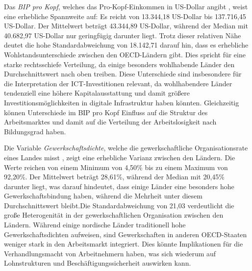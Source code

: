 Das \textit{\ac{BIP} pro Kopf}, welches das Pro-Kopf-Einkommen in US-Dollar angibt 
\parencite{oecd2022gdp}, weist eine erhebliche Spannweite auf: Es reicht von 13.344,18 
US-Dollar bis 137.716,45 US-Dollar. Der Mittelwert beträgt 43.344,89 US-Dollar, während 
der Median mit 40.682,97 US-Dollar nur geringfügig darunter liegt. Trotz dieser relativen 
Nähe deutet die hohe Standardabweichung von 18.142,71 darauf hin, dass es erhebliche 
Wohlstandsunterschiede zwischen den \ac{OECD}-Ländern gibt. Dies spricht für eine starke 
rechtsschiefe Verteilung, da einige besonders wohlhabende Länder den Durchschnittswert 
nach oben treiben. Diese Unterschiede sind insbesondere für die Interpretation der 
\ac{ICT}-Investitionen relevant, da wohlhabendere Länder tendenziell eine höhere 
Kapitalausstattung und damit größere Investitionsmöglichkeiten in digitale Infrastruktur 
haben könnten. Gleichzeitig können Unterschiede im \ac{BIP} pro Kopf Einfluss auf die 
Struktur des Arbeitsmarktes und damit auf die Verteilung der Arbeitslosigkeit nach 
Bildungsgrad haben.

Die Variable \textit{Gewerkschaftsdichte}, welche die gewerkschaftliche Organisationsrate 
eines Landes misst \parencite{oecd2022tud}, zeigt eine erhebliche Varianz zwischen den 
Ländern. Die Werte reichen von einem Minimum von 4,50\% bis zu einem Maximum von 92,20\%. 
Der Mittelwert beträgt 28,61\%, während der Median mit 20,45\% darunter liegt, was darauf 
hindeutet, dass einige Länder eine besonders hohe Gewerkschaftsbindung haben, während die 
Mehrheit unter diesem Durchschnittswert bleibt.Die Standardabweichung von 21,03 
verdeutlicht die große Heterogenität in der gewerkschaftlichen Organisation zwischen den 
Ländern. Während einige nordische Länder traditionell hohe Gewerkschaftsdichten aufweisen, 
sind Gewerkschaften in anderen \ac{OECD}-Staaten weniger stark in den Arbeitsmarkt 
integriert. Dies könnte Implikationen für die Verhandlungsmacht von Arbeitnehmern haben, 
was sich wiederum auf Lohnstrukturen und Beschäftigungssicherheit auswirken kann.

